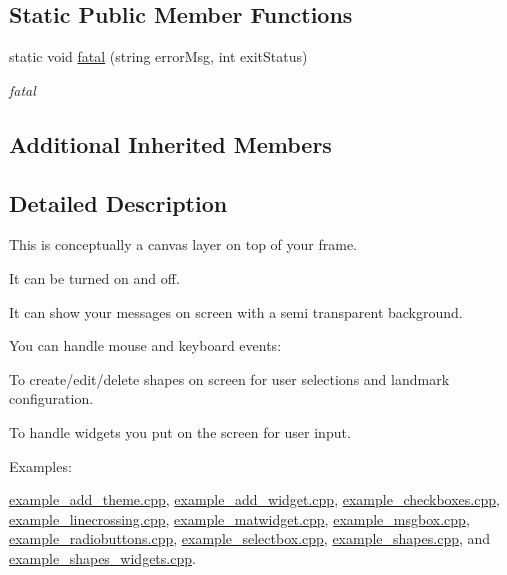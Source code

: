 \subsection*{Static Public Member Functions}
\begin{DoxyCompactItemize}
\item 
static void \hyperlink{classcanvascv_1_1Canvas_add93c0d5cc1e9b49f97510952a8a1961}{fatal} (string error\+Msg, int exit\+Status)
\begin{DoxyCompactList}\small\item\em fatal \end{DoxyCompactList}\end{DoxyCompactItemize}
\subsection*{Additional Inherited Members}


\subsection{Detailed Description}
This is conceptually a canvas layer on top of your frame.
\begin{DoxyItemize}
\item It can be turned on and off.
\item It can show your messages on screen with a semi transparent background.
\item You can handle mouse and keyboard events\+:
\begin{DoxyEnumerate}
\item To create/edit/delete shapes on screen for user selections and landmark configuration.
\item To handle widgets you put on the screen for user input. 
\end{DoxyEnumerate}
\end{DoxyItemize}\begin{Desc}
\item[Examples\+: ]\par
\hyperlink{example_add_theme_8cpp-example}{example\+\_\+add\+\_\+theme.\+cpp}, \hyperlink{example_add_widget_8cpp-example}{example\+\_\+add\+\_\+widget.\+cpp}, \hyperlink{example_checkboxes_8cpp-example}{example\+\_\+checkboxes.\+cpp}, \hyperlink{example_linecrossing_8cpp-example}{example\+\_\+linecrossing.\+cpp}, \hyperlink{example_matwidget_8cpp-example}{example\+\_\+matwidget.\+cpp}, \hyperlink{example_msgbox_8cpp-example}{example\+\_\+msgbox.\+cpp}, \hyperlink{example_radiobuttons_8cpp-example}{example\+\_\+radiobuttons.\+cpp}, \hyperlink{example_selectbox_8cpp-example}{example\+\_\+selectbox.\+cpp}, \hyperlink{example_shapes_8cpp-example}{example\+\_\+shapes.\+cpp}, and \hyperlink{example_shapes_widgets_8cpp-example}{example\+\_\+shapes\+\_\+widgets.\+cpp}.\end{Desc}


